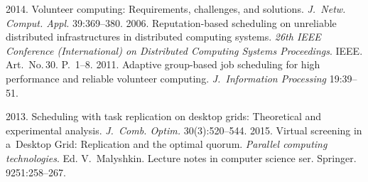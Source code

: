 \begin{multicols}{2}
{{\begin{thebibliography}{99}
 2014. Volunteer computing: 
Requirements, challenges, and solutions. \textit{J.~Netw. Comput. Appl.} 39:369--380.
 2006. Reputation-based scheduling on unreliable distributed infrastructures in 
 distributed computing systems. \textit{26th IEEE Conference 
 (International) on Distributed Computing Systems Proceedings}. IEEE. Art.~No.\,30. P.~1--8.
 2011. Adaptive group-based job scheduling for high performance and reliable 
 volunteer computing.  \textit{J.~Information Processing} 19:39--51.
 
 2013. Scheduling with task replication on desktop grids: 
 Theoretical and experimental analysis.  \textit{J.~Comb. Optim.}
 30(3):520--544.
2015. Virtual screening in a~Desktop Grid: Replication and the optimal quorum. 
\textit{Parallel computing technologies}. Ed. V.~Malyshkin.
Lecture notes in computer science ser. Springer.  9251:258--267.


\end{thebibliography}}}
\end{multicols}
